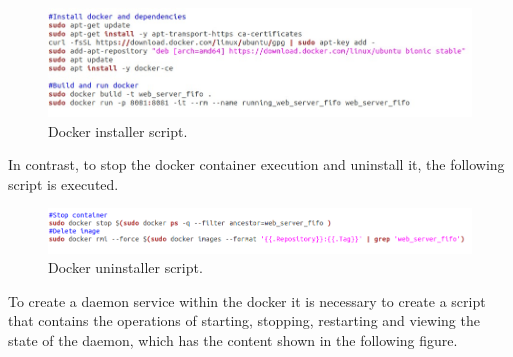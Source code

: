 \documentclass{article}
\begin{document}
\begin{figure}[H]
	\centering
	\captionsetup{justification=centering, margin=1cm}
    \includegraphics[width = \columnwidth]{installdocker.jpeg}
    \caption{Docker installer script.}
	\label{fig:installdocker}
\end{figure}

In contrast, to stop the docker container execution and uninstall it, the following script is executed.

\begin{figure}[H]
	\centering
	\captionsetup{justification=centering, margin=1cm}
    \includegraphics[width = \columnwidth]{removedocker.png}
    \caption{Docker uninstaller script.}
	\label{fig:removedocker}
\end{figure}

To create a daemon service within the docker it is necessary to create a script that contains the operations of starting, stopping, restarting and viewing the state of the daemon, which has the content shown in the following figure.
\end{document}
